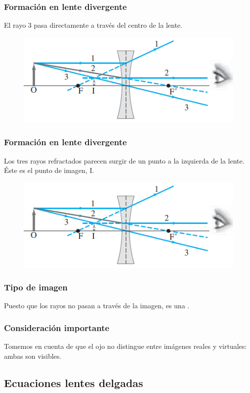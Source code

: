 \documentclass[14pt]{beamer}
\begin{document}
\begin{frame}
\frametitle{Formación en lente divergente}
\vspace*{-1cm}
El rayo 3 pasa directamente a través del centro de la lente.
\begin{figure}
    \centering
    \includegraphics[scale=0.8]{Imagenes/Formacion_Imagen_04.png}
\end{figure}
\end{frame}

\begin{frame}
\frametitle{Formación en lente divergente}
\vspace*{-1cm}
Los tres rayos refractados parecen surgir de un punto a la izquierda de la lente. \pause
Éste es el punto de imagen, I.
\begin{figure}
    \centering
    \includegraphics[scale=0.8]{Imagenes/Formacion_Imagen_04.png}
\end{figure}
\end{frame}
\begin{frame}
\frametitle{Tipo de imagen}
Puesto que los rayos no pasan a través de la imagen, \pause es una .
\end{frame}
\begin{frame}
\frametitle{Consideración importante}
Tomemos en cuenta de que el ojo no distingue entre imágenes reales y virtuales: ambas son visibles.
\end{frame}

\subsection{Ecuaciones lentes delgadas}
\end{document}
